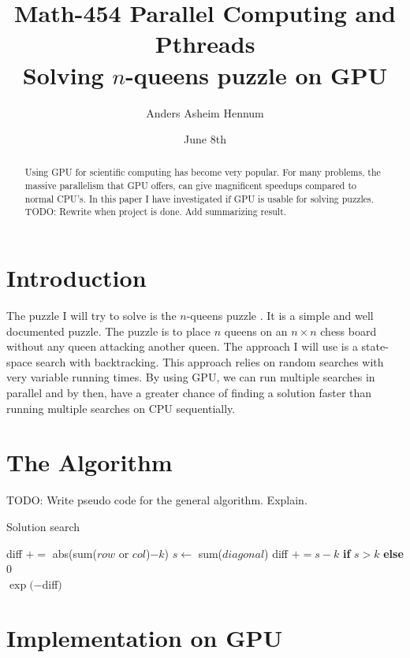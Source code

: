 \documentclass{article}
\title{Math-454 Parallel Computing and Pthreads \\
		Solving $n$-queens puzzle on GPU}
\author{Anders Asheim Hennum}
\date{June 8th}
\begin{document}
\maketitle

\begin{abstract}
Using GPU for scientific computing has become very popular. For many problems, 
the massive parallelism that GPU offers, can give magnificent speedups compared to 
normal CPU's. In this paper I have investigated if GPU is usable for solving puzzles. 
TODO: Rewrite when project is done. Add summarizing result.
\end{abstract}

\section{Introduction}

The puzzle I will try to solve is the $n$-queens puzzle \cite{nqueen}. It is a simple
and well documented puzzle. The puzzle is to place $n$ queens on an $n \times n$ chess
board without any queen attacking another queen. The approach I will use is a state-space
search with backtracking. This approach relies on random searches with very variable running times.
By using GPU, we can run multiple searches in parallel and by then, have a greater chance of finding
a solution faster than running multiple searches on CPU sequentially. 

\section{The Algorithm}

TODO: Write pseudo code for the general algorithm. Explain.

\begin{algorithm}[H]
\caption{Solution search}
\begin{algorithmic}
    \State diff $+=$ abs(sum($row$ or $col$)$-k$)
\EndFor
{}
    \State $s \gets$ sum($diagonal$)
    \State diff $+= s-k$ \textbf{if} $s>k$ \textbf{else} 0
\EndFor \\
\Return $\exp(-$diff$)$
\EndFunction

\end{algorithmic}
\end{algorithm}

\section{Implementation on GPU}
\end{document}
